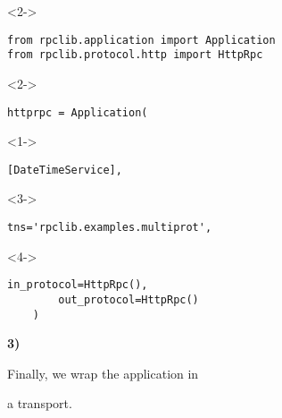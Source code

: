 \documentclass{beamer}
\begin{document}
\begin{frame}[fragile]
\begin{uncoverenv}<2->
  \vspace{-13pt}
  \begin{lstlisting}[frame=none]
from rpclib.application import Application
from rpclib.protocol.http import HttpRpc
  \end{lstlisting}
\end{uncoverenv}
\begin{uncoverenv}<2->
  \begin{lstlisting}[frame=none]
httprpc = Application(
  \end{lstlisting}
\end{uncoverenv}
\begin{uncoverenv}<1->
  \vspace{-13pt}
  \begin{lstlisting}[frame=none]
        [DateTimeService],
  \end{lstlisting}
\end{uncoverenv}
\begin{uncoverenv}<3->
  \vspace{-13pt}
  \begin{lstlisting}[frame=none]
        tns='rpclib.examples.multiprot',
  \end{lstlisting}
\end{uncoverenv}
\begin{uncoverenv}<4->
  \vspace{-13pt}
  \begin{lstlisting}[frame=none]
        in_protocol=HttpRpc(),
        out_protocol=HttpRpc()
    )
  \end{lstlisting}
\end{uncoverenv}
\end{frame}

\begin{frame}
  \LARGE
  \color{red} \textbf{3)} \color{black}

  \begin{center}
    Finally, we wrap the application in

    \bigskip

    a transport.

  \end{center}

\end{frame}
\end{document}
